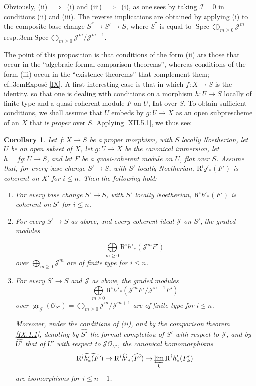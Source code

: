\documentclass[11pt,a4paper,oneside]{book}
\providecommand{\sisi}[2]{#2}
\providecommand{\pageoriginale}{%
  \refstepcounter{pageoriginal}%
  \marginpar{\raggedright\footnotesize\bfseries\thepageoriginal}%
  \xspace}
\providecommand{\og}{``}
\providecommand{\fg}{''\xspace}
\providecommand{\cf}{cf.\kern.3em}
\providecommand{\resp}{resp.\kern.3em}
\providecommand{\Ii}{\mathcal I}
\providecommand{\Jj}{\mathcal J}
\providecommand{\Oo}{\mathcal O}
\DeclareMathOperator{\gr}{gr}
\providecommand{\Spec}{\operatorname{Spec}}
\providecommand{\R}{\mathrm R}
\providecommand{\ALORS}{\unskip~$\Longrightarrow$~\ignorespaces}
\providecommand{\tbigoplus}{\mathop{\textstyle\bigoplus}\limits}
\newenvironment{enumeratei}
  {\begin{enumerate}[label=(\roman*)]}
  {\end{enumerate}}
\theoremstyle{plain}
\newtheorem{corollaire}[subsection]{Corollary}
\theoremstyle{definition}
\theoremstyle{remark}
\renewcommand{\Ref}[1]{\textup{\ref{#1}}}
\begin{document}
Obviously, (ii) \ALORS (i) and (iii) \ALORS (i), as one sees by taking $\Ii=0$ in conditions (ii) and (iii). The reverse implications are obtained by applying (i) to the composite base change $S^{''}\to S'\to S$, where $S^{''}$ is equal to $\Spec \sisi{\coprod}{\bigoplus}_{m\geq 0} \Jj^m$ \resp $\Spec \sisi{\coprod}{\bigoplus}_{m\geq 0} \Jj^m/\Jj^{m+1}$.

The point of this proposition is that conditions of the form (ii) are those that occur in the \og algebraic-formal comparison theorems\fg, whereas conditions of the form (iii) occur in the \og existence theorems\fg that complement them; \cf Expos\'e \Ref{IX}. A first interesting case is that in which $f:X\to S$ is the identity, so that one is dealing with conditions on a morphism $h:U\to S$ locally of finite type and a quasi-coherent module $F$ on $U$, flat over $S$. To obtain sufficient conditions, we shall assume that $U$ embeds by $g:U\to X$ as an open subprescheme of an $X$ that is \emph{proper} over $S$. Applying \Ref{XII.5.1}, we thus see:

\begin{corollaire} \label{XII.5.8}
Let $f:X\to S$ be a proper morphism, with $S$ locally Noetherian, let $U$ be an open subset of $X$, let $g:U\to X$ be the canonical immersion, let $h=fg:U\to S$, and let $F$ be a quasi-coherent module on $\sisi{X}{U}$, flat over $S$. Assume that, for every base change $S'\to S$, with $S'$ locally Noetherian, $\R^ig'_\ast(F')$ is coherent on $X'$ for $i\leq n$. Then the following hold:
\begin{enumeratei}
\item
For every base change $S'\to S$, with $S'$ locally Noetherian, $\R^ih'_\ast(F')$ is coherent on $S'$ for $i\leq n$.
\item
For every $S'\to S$ as above, and every coherent ideal $\Jj$ on $S'$, the graded modules\pageoriginale
\[
\sisi{\coprod}{\tbigoplus}_{m\geq 0} \R^ih'_\ast(\Jj^mF')
\]
over $\sisi{\coprod}{\bigoplus}_{m\geq 0}\Jj^m$ are of finite type for $i\leq n$.
\item
For every $S'\to S$ and $\Jj$ as above, the graded modules
\[
\sisi{\coprod}{\tbigoplus}_{m\geq 0} \R^ih'_\ast(\Jj^mF'/\Jj^{m+1}F')
\]
over $\gr_\Jj(\Oo_{S'})=\sisi{\coprod}{\bigoplus}_{m\geq 0}\Jj^m/\Jj^{m+1}$ are of finite type for $i\leq n$.

Moreover, under the conditions of (ii), and by the comparison theorem \Ref{IX.1.1}, denoting by $\widehat{S'}$ the formal completion of $S'$ with respect to $\Jj$, and by $\widehat{U'}$ that of $U'$ with respect to $\Jj\Oo_{U'}$, the canonical homomorphisms
\[
\widehat{\R^ih'_\ast(F')} \to \R^i\widehat{h'}_\ast(\widehat{F'}) \to \varprojlim_k\R^ih'_\ast(F'_k)
\]
are isomorphisms for $i\leq n-1$.
\end{enumeratei}
\end{corollaire}
\end{document}

